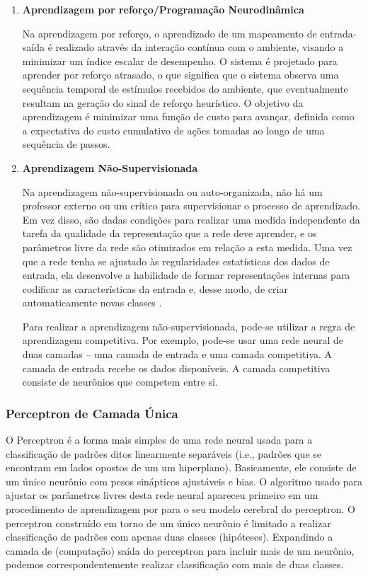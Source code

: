 \begin{enumerate}
\item \textbf{Aprendizagem por reforço/Programação Neurodinâmica}

Na aprendizagem por reforço, o aprendizado de um mapeamento de entrada-saída é realizado através da interação contínua com o ambiente, visando a minimizar um índice escalar de desempenho. O sistema é projetado para aprender por reforço atrasado, o que significa que o sistema observa uma sequência temporal de estímulos recebidos do ambiente, que eventualmente resultam na geração do sinal de reforço heurístico. O objetivo da aprendizagem é minimizar uma função de custo para avançar, definida como a expectativa do custo cumulativo de ações tomadas ao longo de uma sequência de passos.

\item \textbf{Aprendizagem Não-Supervisionada}

Na aprendizagem não-supervisionada ou auto-organizada, não há um professor externo ou um crítico para supervisionar o processo de aprendizado. Em vez disso, são dadas condições para realizar uma medida independente da tarefa da qualidade da representação que a rede deve aprender, e os parâmetros livre da rede são otimizados em relação a esta medida. Uma vez que a rede tenha se ajustado às regularidades estatísticas dos dados de entrada, ela desenvolve a habilidade de formar representações internas para codificar as características da entrada e, desse modo, de criar automaticamente novas classes \cite{becker1991unsupervised}.

Para realizar a aprendizagem não-supervisionada, pode-se utilizar a regra de aprendizagem competitiva. Por exemplo, pode-se usar uma rede neural de duas camadas -- uma camada de entrada e uma camada competitiva. A camada de entrada recebe os dados disponíveis. A camada competitiva consiste de neurônios que competem entre si.
\end{enumerate}

\subsubsection{Perceptron de Camada Única}
O Perceptron é a forma mais simples de uma rede neural usada para a classificação de padrões ditos linearmente separáveis (i.e., padrões que se encontram em lados opostos de um um hiperplano). Basicamente, ele consiste de um único neurônio com pesos sinápticos ajustáveis e bias. O algoritmo usado para ajustar os parâmetros livres desta rede neural apareceu primeiro em um procedimento de aprendizagem por  para o seu modelo cerebral do perceptron. O perceptron construído em torno de um único neurônio é limitado a realizar classificação de padrões com apenas duas classes (hipóteses). Expandindo a camada de (computação) saída do perceptron para incluir mais de um neurônio, podemos correspondentemente realizar classificação com mais de duas classes. 

